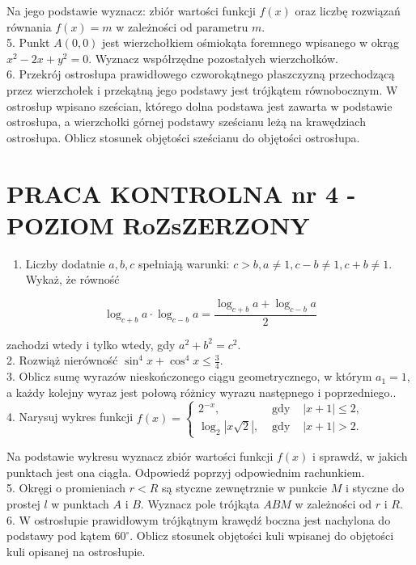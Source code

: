\documentclass[10pt]{article}
\begin{document}
Na jego podstawie wyznacz: zbiór wartości funkcji $f(x)$ oraz liczbę rozwiązań równania $f(x)=m$ w zależności od parametru $m$.\\
5. Punkt $A(0,0)$ jest wierzchołkiem ośmiokąta foremnego wpisanego w okrąg $x^{2}-2 x+y^{2}=0$. Wyznacz współrzędne pozostałych wierzchołków.\\
6. Przekrój ostrosłupa prawidłowego czworokątnego płaszczyzną przechodzącą przez wierzchołek i przekątną jego podstawy jest trójkątem równobocznym. W ostrosłup wpisano sześcian, którego dolna podstawa jest zawarta w podstawie ostrosłupa, a wierzchołki górnej podstawy sześcianu leżą na krawędziach ostrosłupa. Oblicz stosunek objętości sześcianu do objętości ostrosłupa.

\section*{PRACA KONTROLNA nr 4 - POZIOM RoZsZERZONY}
\begin{enumerate}
  \item Liczby dodatnie $a, b, c$ spełniają warunki: $c>b, a \neq 1, c-b \neq 1, c+b \neq 1$. Wykaż, że równość
\end{enumerate}

$$
\log _{c+b} a \cdot \log _{c-b} a=\frac{\log _{c+b} a+\log _{c-b} a}{2}
$$

zachodzi wtedy i tylko wtedy, gdy $a^{2}+b^{2}=c^{2}$.\\
2. Rozwiąż nierówność $\sin ^{4} x+\cos ^{4} x \leqslant \frac{3}{4}$.\\
3. Oblicz sumę wyrazów nieskończonego ciągu geometrycznego, w którym $a_{1}=1$, a każdy kolejny wyraz jest połową różnicy wyrazu następnego i poprzedniego..\\
4. Narysuj wykres funkcji $f(x)=\left\{\begin{array}{rrl}2^{-x}, & \text { gdy } & |x+1| \leqslant 2, \\ \log _{2}|x \sqrt{2}|, & \text { gdy } & |x+1|>2 .\end{array}\right.$

Na podstawie wykresu wyznacz zbiór wartości funkcji $f(x)$ i sprawdź, w jakich punktach jest ona ciągła. Odpowiedź poprzyj odpowiednim rachunkiem.\\
5. Okręgi o promieniach $r<R$ są styczne zewnętrznie w punkcie $M$ i styczne do prostej $l$ w punktach $A$ i $B$. Wyznacz pole trójkąta $A B M$ w zależności od $r$ i $R$.\\
6. W ostrosłupie prawidłowym trójkątnym krawędź boczna jest nachylona do podstawy pod kątem $60^{\circ}$. Oblicz stosunek objętości kuli wpisanej do objętości kuli opisanej na ostrosłupie.
\end{document}
